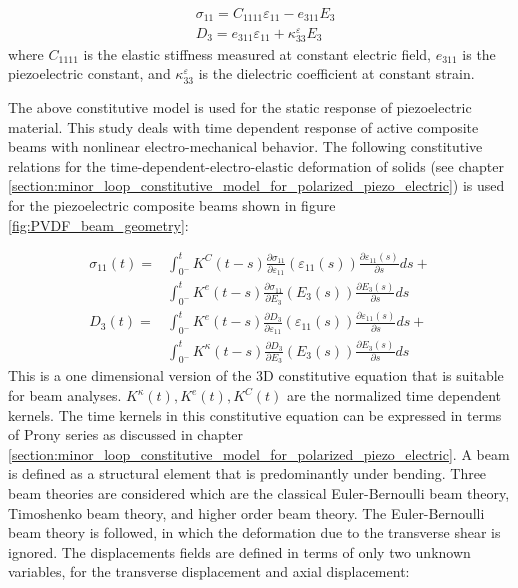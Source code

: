 \begin{equation}
\begin{aligned}
&\sigma_{11}=C_{1111} \varepsilon_{11}-e_{311} E_{3} \\
&D_3=e_{311} \varepsilon_{11}+\kappa_{33}^\varepsilon E_{3}
\end{aligned}
\label{stress_1D_const_eqn_beam:EQN}
\end{equation}
where $C_{1111}$ is the elastic stiffness measured at constant electric field,
$e_{311}$ is the piezoelectric constant, and $\kappa_{33}^\varepsilon$ is the dielectric coefficient at constant strain.

The above constitutive model is used for the static response of piezoelectric material.
This study deals with time dependent response of active composite beams with nonlinear electro-mechanical behavior.
The following constitutive relations for the time-dependent-electro-elastic deformation of solids
 (see chapter \ref{section:minor_loop_constitutive_model_for_polarized_piezo_electric}) is used for the piezoelectric composite beams shown in figure \ref{fig:PVDF_beam_geometry}:

\begin{equation}
\begin{aligned}
\sigma_{11}(t)=
&\int_{0^-}^t
K^C(t-s)\frac{\partial \sigma_{11}}{\partial\varepsilon_{11}} (\varepsilon_{11}(s))\frac{\partial {\varepsilon}_{11}(s)}  {\partial s} ds +\\
&\int_{0^-}^t
K^e (t-s) \frac{\partial \sigma_{11}}{\partial E_{3}}(E_3(s))  \frac{\partial {E}_{3} (s)}  {\partial s} ds
\\
D_3(t)=
&\int_{0^-}^t
K^{e}(t-s)
\frac{\partial D_{3}}{\partial \varepsilon_{11}}(\varepsilon_{11}(s))
\frac{ \partial {\varepsilon}_{11}(s)}  {\partial s}  ds + \\
&\int_{0^-}^t
K^{\kappa}(t-s) \frac{\partial D_{3}}{\partial E_{3}}(E_3(s))  \frac{\partial {E}_{3} (s)}  {\partial s} ds
\end{aligned}
\label{visco_stress_1D_const_eqn_beam:EQN}
\end{equation}
This is a one dimensional version of the 3D constitutive equation that is suitable for beam analyses.
$K^{\kappa}(t), K^e(t), K^C(t)$ are the normalized time dependent kernels.
The time kernels in this constitutive equation can be expressed in terms of Prony series as discussed in chapter \ref{section:minor_loop_constitutive_model_for_polarized_piezo_electric}. 
A beam is defined as a structural element that is predominantly under bending. 
Three beam theories are considered which are the classical Euler-Bernoulli beam theory, Timoshenko beam theory, and higher order beam theory.
The Euler-Bernoulli beam theory is followed, in which the deformation due to the transverse shear is ignored.
The displacements fields are defined in terms of only two unknown variables, for the transverse displacement and axial displacement:

